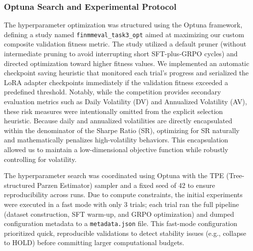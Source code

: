     \subsubsection{Optuna Search and Experimental Protocol}

    The hyperparameter optimization was structured using the Optuna framework, defining a study named \texttt{finmmeval\_task3\_opt} aimed at maximizing our custom composite validation fitness metric. The study utilized a default pruner (without intermediate pruning to avoid interrupting short SFT-plus-GRPO cycles) and directed optimization toward higher fitness values. We implemented an automatic checkpoint saving heuristic that monitored each trial's progress and serialized the LoRA adapter checkpoints immediately if the validation fitness exceeded a predefined threshold. Notably, while the competition provides secondary evaluation metrics such as Daily Volatility (DV) and Annualized Volatility (AV), these risk measures were intentionally omitted from the explicit selection heuristic. Because daily and annualized volatilities are directly encapsulated within the denominator of the Sharpe Ratio (SR), optimizing for SR naturally and mathematically penalizes high-volatility behaviors. This encapsulation allowed us to maintain a low-dimensional objective function while robustly controlling for volatility.
    
    The hyperparameter search was coordinated using Optuna with the TPE (Tree-structured Parzen Estimator) sampler and a fixed seed of 42 to ensure reproducibility across runs. Due to compute constraints, the initial experiments were executed in a fast mode with only 3 trials; each trial ran the full pipeline (dataset construction, SFT warm-up, and GRPO optimization) and dumped configuration metadata to a \texttt{metadata.json} file. This fast-mode configuration prioritized quick, reproducible validations to detect stability issues (e.g., collapse to HOLD) before committing larger computational budgets.

